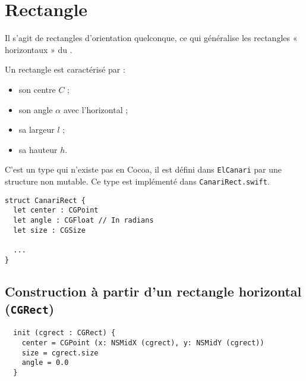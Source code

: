 

\chapter{Rectangle}

Il s'agit de rectangles d'orientation quelconque, ce qui généralise les rectangles « horizontaux » du .

Un rectangle est caractérisé par :
\begin{itemize}
  \item son centre $C$ ;
  \item son angle $\alpha$ avec l'horizontal ;
  \item sa largeur $l$ ;
  \item sa hauteur $h$.
\end{itemize}

\begin{center}
\end{center}

C'est un type qui n'existe pas en Cocoa, il est défini dans \texttt{ElCanari} par une structure non mutable. Ce type est implémenté dans \texttt{CanariRect.swift}.

\begin{lstlisting}
struct CanariRect {
  let center : CGPoint
  let angle : CGFloat // In radians
  let size : CGSize
  
  ...
}
\end{lstlisting}





\section{Construction à partir d'un rectangle horizontal (\texttt{CGRect})}

\begin{lstlisting}
  init (cgrect : CGRect) {
    center = CGPoint (x: NSMidX (cgrect), y: NSMidY (cgrect))
    size = cgrect.size
    angle = 0.0
  }
\end{lstlisting}






